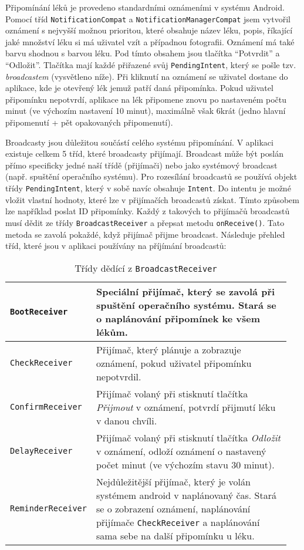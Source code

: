\documentclass[../TakeYourPill.tex]{subfiles}
\begin{document}
Připomínání léků je provedeno standardními oznámeními v systému Android. Pomocí tříd \texttt{NotificationCompat} a \texttt{NotificationManagerCompat} jsem vytvořil oznámení s nejvyšší možnou prioritou, které obsahuje název léku, popis, říkající jaké množství léku si má uživatel vzít a případnou fotografii. Oznámení má také barvu shodnou s barvou léku. Pod tímto obsahem jsou tlačítka \enquote{Potvrdit} a \enquote{Odložit}. Tlačítka mají každé přiřazené svůj \texttt{PendingIntent}, který se pošle tzv. \textit{broadcastem} (vysvětleno níže). Při kliknutí na oznámení se uživatel dostane do aplikace, kde je otevřený lék jemuž patří daná připomínka. Pokud uživatel připomínku nepotvrdí, aplikace na lék připomene znovu po nastaveném počtu minut (ve výchozím nastavení 10 minut), maximálně však 6krát (jedno hlavní připomenutí + pět opakovaných připomenutí).


Broadcasty jsou důležitou součástí celého systému připomínání. V aplikaci existuje celkem 5 tříd, které broadcasty přijímají. Broadcast může být poslán přímo specificky jedné naší třídě (přijímači) nebo jako systémový broadcast (např. spuštění operačního systému). Pro rozesílání broadcastů se používá objekt třídy \texttt{PendingIntent}, který v sobě navíc obsahuje \texttt{Intent}. Do intentu je možné vložit vlastní hodnoty, které lze v přijímačích broadcastů získat. Tímto způsobem lze například poslat ID připomínky. Každý z takových to přijímačů broadcastů musí dědit ze třídy \texttt{BroadcastReceiver} a přepsat metodu \texttt{onReceive()}. Tato metoda se zavolá pokaždé, když přijímač přijme broadcast. Následuje přehled tříd, které jsou v aplikaci používány na příjímání broadcastů:


\begin{table}[h]
  \begin{tabular}{ |p{0.25\linewidth} | p{0.70\linewidth}| }
    \hline
    \texttt{BootReceiver} & Speciální přijímač, který se zavolá při spuštění operačního systému. Stará se o naplánování připomínek ke všem lékům.\\
    \hline
    \texttt{CheckReceiver} & Přijímač, který plánuje a zobrazuje oznámení, pokud uživatel připomínku nepotvrdil. \\
    \hline
    \texttt{ConfirmReceiver} & Přijímač volaný při stisknutí tlačítka \textit{Přijmout} v oznámení, potvrdí přijmutí léku v danou chvíli. \\
    \hline
    \texttt{DelayReceiver} & Přijímač volaný při stisknutí tlačítka \textit{Odložit} v oznámení, odloží oznámení o nastavený počet minut (ve výchozím stavu 30 minut). \\
    \hline
    \texttt{ReminderReceiver} & Nejdůležitější přijímač, který je volán systémem android v naplánovaný čas. Stará se o zobrazení oznámení, naplánování přijímače \texttt{CheckReceiver} a naplánování sama sebe na další připomínku u léku. \\
    \hline
  \end{tabular}
  \caption{Třídy dědící z \texttt{BroadcastReceiver}}
\end{table}
\end{document}
